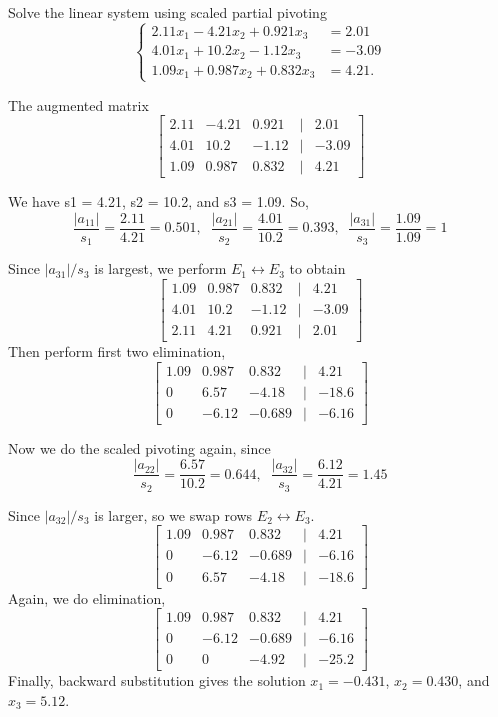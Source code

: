 	
	\begin{ex}
		Solve the linear system using scaled partial pivoting
		\[ \begin{cases}
		2.11x_1 - 4.21x_2 + 0.921x_3 &= 2.01\\
		4.01x_1 + 10.2x_2 -  1.12x_3 &= -3.09\\
		1.09x_1 + 0.987x_2 +0.832x_3 &= 4.21.
		\end{cases} \]
	\end{ex}
	\begin{solution}
		The augmented matrix
		\[ \begin{bmatrix}
		2.11 & -4.21 & 0.921 & \vert & 2.01\\
		4.01 & 10.2  & -1.12 & \vert & -3.09\\
		1.09 & 0.987 & 0.832 & \vert & 4.21
		\end{bmatrix} \]
		
		We have s1 = 4.21, s2 = 10.2, and s3 = 1.09. So,
		\[ \frac{|a_{11}|}{s_1} = \frac{2.11}{4.21} = 0.501,\;\; 
		\frac{|a_{21}|}{s_2} = \frac{4.01}{10.2} = 0.393,\;\;
		\frac{|a_{31}|}{s_3} = \frac{1.09}{1.09} = 1 \]
		
		Since $|a_{31}|/s_3$ is largest, we perform $E_1 \leftrightarrow E_3$ to obtain
		\[ \begin{bmatrix}
		1.09 &0.987& 0.832& \vert& 4.21\\
		4.01 &10.2 &-1.12 &\vert &-3.09\\
		2.11 &4.21 & 0.921& \vert& 2.01
		\end{bmatrix} \]
		Then perform first two elimination,
		\[ \begin{bmatrix}
		1.09 &0.987 &0.832 &\vert &4.21\\
		0    &6.57  &-4.18 &\vert &-18.6\\
		0    &-6.12 &-0.689& \vert& -6.16
		\end{bmatrix} \]
		
		Now we do the scaled pivoting again, since 
		\[ \frac{|a_{22}|}{s_2} = \frac{6.57}{10.2} = 0.644,\;\;
		\frac{|a_{32}|}{s_3} = \frac{6.12}{4.21} = 1.45 \]
		
		Since $|a_{32}|/s_3$ is larger, so we swap rows $E_2 \leftrightarrow E_3$.
		\[ \begin{bmatrix}
		1.09 &0.987 &0.832 &\vert &4.21\\
		0    &-6.12 &-0.689& \vert& -6.16\\
		0    &6.57  &-4.18 &\vert &-18.6
		\end{bmatrix} \]
		Again, we do elimination,
		\[ \begin{bmatrix}
		1.09 &0.987 &0.832 &\vert &4.21\\
		0    &-6.12 &-0.689& \vert& -6.16\\
		0    &0     &-4.92 &\vert &-25.2
		\end{bmatrix} \]
		Finally, backward substitution gives the solution $x_1 = -0.431$, $x_2 = 0.430$, and $x_3 = 5.12$.
	\end{solution}
	
